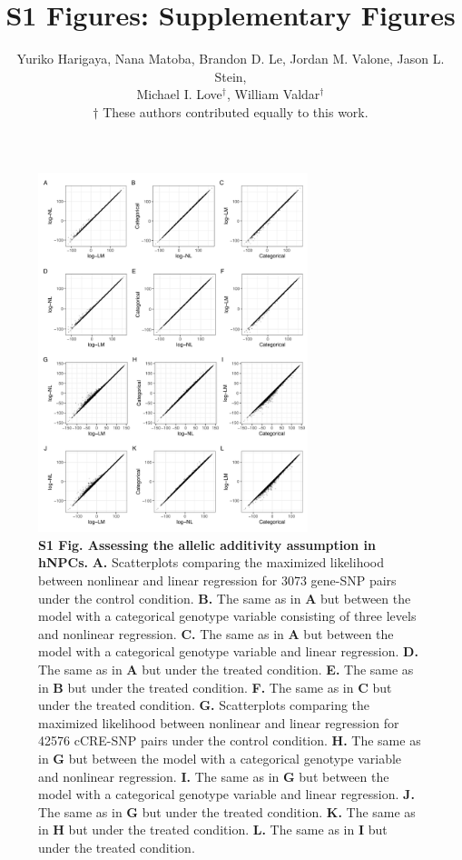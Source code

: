 \documentclass[11pt]{article}
\title{S1 Figures: Supplementary Figures}
\author{
  Yuriko Harigaya,
  Nana Matoba,
  Brandon D. Le,
  Jordan M. Valone,
  Jason L. Stein, \\
  Michael I. Love$^\dagger$,
  William Valdar$^\dagger$ \\
  \small $\dagger$ These authors contributed equally to this work.
}
\begin{document}

\begin{figure}[!ht]
\begin{center}
  \includegraphics[width=0.7\textwidth]{png/wnt_llk.png}
\end{center}  
\caption{
  {\bf
    S1 Fig.
    Assessing the allelic additivity assumption in hNPCs.}
\textbf{A.} Scatterplots comparing the maximized likelihood between nonlinear and linear regression for 3073 gene-SNP pairs under the control condition. \textbf{B.} The same as in \textbf{A} but between the model with a categorical genotype variable consisting of three levels and nonlinear regression. \textbf{C.} The same as in \textbf{A} but between the model with a categorical genotype variable and linear regression. \textbf{D.} The same as in \textbf{A} but under the treated condition. \textbf{E.} The same as in \textbf{B} but under the treated condition. \textbf{F.} The same as in \textbf{C} but under the treated condition. \textbf{G.} Scatterplots comparing the maximized likelihood between nonlinear and linear regression for 42576 cCRE-SNP pairs under the control condition. \textbf{H.} The same as in \textbf{G} but between the model with a categorical genotype variable and nonlinear regression. \textbf{I.} The same as in \textbf{G} but between the model with a categorical genotype variable and linear regression. \textbf{J.} The same as in \textbf{G} but under the treated condition. \textbf{K.} The same as in \textbf{H} but under the treated condition. \textbf{L.} The same as in \textbf{I} but under the treated condition.
}
\label{s-fig:wnt-llk}
\end{figure}
\end{document}
